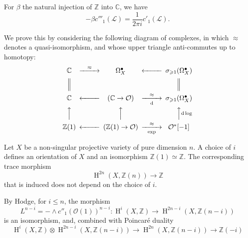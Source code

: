     \label{hodge-theory-ii-2.2.5.2}\par{}For \(\beta \) the natural injection of \(\mathbb {Z}\) into \(\mathbb {C}\), we have
        \[           -\beta  c'''_1(\mathcal {L})           = \frac {1}{2\pi  i}c'_1(\mathcal {L}).         \]\par{}We prove this by considering the following diagram of complexes, in which \(\approx \) denotes a quasi-isomorphism, and whose upper triangle anti-commutes up to homotopy:
    \[       \begin {CD}         \mathbb {C} @>\approx >> \Omega _X^\bullet  @<<< \sigma _{\geqslant 1}(\Omega _X^\bullet )       \\@| @. @|       \\\mathbb {C} @<<< (\mathbb {C}\to \mathcal {O}) @>\approx >\mathrm {d}> \sigma _{\geqslant 1}(\Omega _X^\bullet )       \\@AAA @AAA @AA{\mathrm {d}\log }A       \\\mathbb {Z}(1) @<<< (\mathbb {Z}(1)\to \mathcal {O}) @>\approx >\exp > \mathcal {O}^*[-1]       \end {CD}     \]\label{hodge-theory-ii-2.2.6}\par{}Let \(X\) be a non-singular projective variety of pure dimension \(n\).
    A choice of \(i\) defines an orientation of \(X\) and an isomorphism \(\mathbb {Z}(1)\simeq \mathbb {Z}\).
    The corresponding trace morphism
    \[       \operatorname {H}^{2n}(X,\mathbb {Z}(n)) \to  \mathbb {Z}     \]
    that is induced does not depend on the choice of \(i\).\par{}By Hodge, for \(i\leqslant  n\), the morphism
    \[       L^{n-i}       = -\wedge  c''_1(\mathcal {O}(1))^{n-i}\colon        \operatorname {H}^i(X,\mathbb {Z}) \to  \operatorname {H}^{2n-i}(X,\mathbb {Z}(n-i))     \]
    is an isomorphism, and, combined with Poincaré duality
    \[       \operatorname {H}^i(X,\mathbb {Z})\otimes \operatorname {H}^{2n-i}(X,\mathbb {Z}(n-i))       \to  \operatorname {H}^{2n}(X,\mathbb {Z}(n-i))       \to  \mathbb {Z}(-i)     \]
